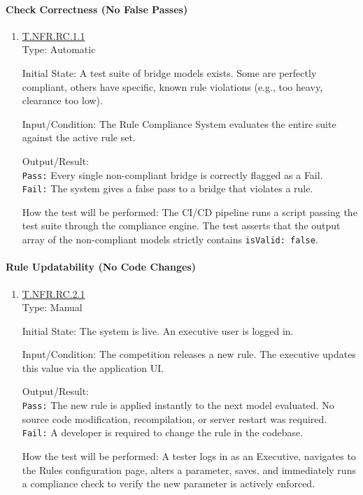 \documentclass[12pt, titlepage]{article}
\newcommand{\testdef}[1]{\leavevmode\hypertarget{test:#1}{}\hyperlink{trace:#1}{#1}}
\begin{document}
\paragraph{Check Correctness (No False Passes)}
\begin{enumerate}
  \item \testdef{T.NFR.RC.1.1}\\
  Type: Automatic

  Initial State: A test suite of bridge models exists. Some are perfectly compliant, others have specific, known rule violations (e.g., too heavy, clearance too low).

  Input/Condition: The Rule Compliance System evaluates the entire suite against the active rule set.

  Output/Result: \\
  \texttt{Pass:} Every single non-compliant bridge is correctly flagged as a Fail.\\
  \texttt{Fail:} The system gives a false pass to a bridge that violates a rule. 

  How the test will be performed: The CI/CD pipeline runs a script passing the test suite through the compliance engine. The test asserts that the output array of the non-compliant models strictly contains \texttt{isValid: false}.
\end{enumerate}

\paragraph{Rule Updatability (No Code Changes)}
\begin{enumerate}
  \item \testdef{T.NFR.RC.2.1}\\
  Type: Manual

  Initial State: The system is live. An executive user is logged in.

  Input/Condition: The competition releases a new rule. The executive updates this value via the application UI.

  Output/Result: \\
  \texttt{Pass:} The new rule is applied instantly to the next model evaluated. No source code modification, recompilation, or server restart was required.\\
  \texttt{Fail:} A developer is required to change the rule in the codebase.

  How the test will be performed: A tester logs in as an Executive, navigates to the Rules configuration page, alters a parameter, saves, and immediately runs a compliance check to verify the new parameter is actively enforced.
\end{enumerate}
\end{document}
